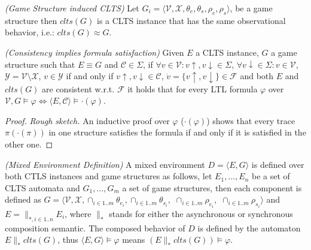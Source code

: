 \begin{definition}
	\label{def:gs_conversion} \emph{(Game Structure induced CLTS)} 
	Let $G_i=\langle \mathcal{V}, \mathcal{X}, \theta_{e}, \theta_{s}, \rho_{e}, \rho_{s}\rangle$, be a game structure then $clts(G)$ is a CLTS instance that has the same observational behavior, i.e.: $clts(G) \approx G$. 
\end{definition}

\begin{lemma}
	\label{def:gs_clts_equiv_implies_satifaction} \emph{(Consistency implies formula satisfaction)} 
	Given $E$ a CLTS instance, $G$ a game structure such that $E \equiv G$ and $\mathcal{C} \in \Sigma$, if $\forall v \in \mathcal{V}: v\uparrow, v\downarrow \in \Sigma$, $\forall v\downarrow \in \Sigma : v \in \mathcal{V}$,
	$\mathcal{Y} = \mathcal{V}\setminus \mathcal{X}$, $v \in \mathcal{Y}$ if and only if $v\uparrow, v\downarrow \in \mathcal{C}$, $\dot{v} = \lbrace v\uparrow, v\downarrow \rbrace \in \mathcal{F}$ and both $E$ and $clts(G)$ are consistent w.r.t. $\mathcal{F}$ it holds that for every LTL formula $\varphi$ over $\mathcal{V}, G \models \varphi \iff \langle E, \mathcal{C} \rangle \models \cdot(\varphi)$.
\end{lemma}

\begin{proof}
	\emph{Rough sketch.} An inductive proof over $\varphi$ ($\cdot(\varphi)$) shows that every trace $\pi (\cdot(\pi))$ in one structure satisfies the formula if and only if it is satisfied in the other one. 
\end{proof}

\begin{definition}
	\label{def:mixed_env} \emph{(Mixed Environment Definition)} 
	A mixed environment $D = \langle E, G \rangle$ is defined over both CTLS instances and game structures as follows,
	let $E_1,\ldots,E_n$ be a set of CLTS automata and $G_1,\ldots,G_m$ a set of game structures,
	then each component is defined as $G=\langle \mathcal{V}, \mathcal{X}, \cap_{i \in 1..m}\theta_{e_i}, \cap_{i \in 1..m}\theta_{s_i},$ $\cap_{i \in 1..m}\rho_{e_i},$ $\cap_{i \in 1..m}\rho_{s_i}\rangle$ and $E = \parallel_{*,i \in 1..n} E_i$, where $\parallel_*$ stands for either the asynchronous or synchronous composition semantic.
	The composed behavior of $D$ is defined by the automaton $E \parallel_* clts(G)$, thus $\langle E, G \rangle \models \varphi$ means $(E \parallel_* clts(G)) \models \varphi$.
\end{definition}


